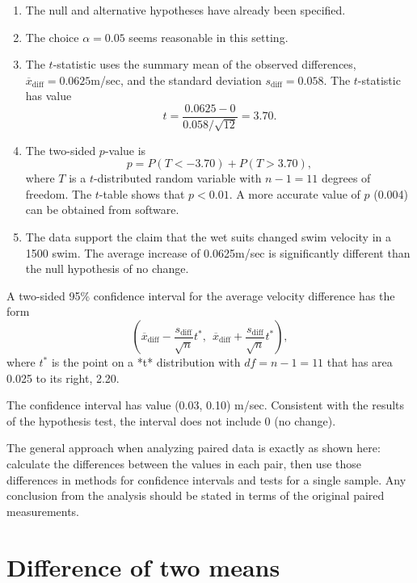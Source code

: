 \begin{enumerate}

 \item The null and alternative hypotheses have already been specified.

  \item The choice $\alpha = 0.05$ seems reasonable in this setting.

  \item The $t$-statistic uses the summary mean of the observed differences, $\overline{x}_{\text{diff}} = 0.0625$m/sec, and the standard deviation $s_{\text{diff}} = 0.058$.  The $t$-statistic has value  
\[
	  t = \frac{0.0625 - 0}{0.058/\sqrt{12}} = 3.70. 
\]

\item The two-sided $p$-value is
$$ p = P(T < -\text{3.70}) + P(T > \text{3.70}), $$
where $T$ is a $t$-distributed random variable with $n-1 = 11$  degrees of freedom.
The $t$-table shows that $p < 0.01$. A more accurate value of $p$ (0.004) can be obtained from software. 

\item  The data support the claim that the wet suits changed swim velocity in a 1500 swim. The average increase of 0.0625m/sec is significantly different than  the null hypothesis of no change.

\end{enumerate}

A two-sided 95\% confidence interval for the average velocity difference has the form 
\[ \left(
  \overline{x}_{\text{diff}} - \frac{s_{\text{diff}}}{\sqrt{n}} t^*,
  \:\: \overline{x}_{\text{diff}} + \frac{s_{\text{diff}}}{\sqrt{n}} t^* \right), 
\] 
where $t^*$ is the point on a *t* distribution with $df = n-1 = 11$ that has area 0.025 to its right, 2.20.

The confidence interval has value (0.03, 0.10) m/sec.  Consistent with the results of the hypothesis test, the interval does not include 0 (no change).

The general approach when analyzing paired data is exactly as shown here: calculate the differences between the values in each pair, then use those differences in methods for confidence intervals and tests for a single sample.   Any conclusion from the analysis should be stated in terms of the original paired measurements.


\section{Difference of two means}
\label{differenceOfTwoMeans}


